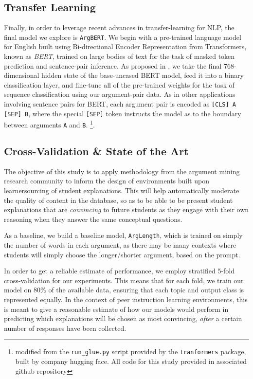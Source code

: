 \documentclass[runningheads]{llncs}
\begin{document}
\subsection{Transfer Learning}
Finally, in order to leverage recent advances in transfer-learning for NLP, the 
final model we explore is \verb|ArgBERT|.
We begin with a pre-trained language model for English built using  
Bi-directional Encoder Representation from Transformers, known as 
\textit{BERT}\cite{devlin_bert_2018}, trained on large bodies of text for the 
task of masked token prediction and sentence-pair inference. 
As proposed in \cite{toledo_automatic_2019}, we take the final 768-dimensional 
hidden state of the base-uncased BERT model, feed it into a binary 
classification layer, and fine-tune all of the pre-trained weights for the task 
of sequence classification using our argument-pair data. 
As in other applications involving sentence pairs for BERT, each argument pair 
is encoded as \verb|[CLS] A [SEP] B|, where the special \verb|[SEP]| token 
instructs the model as to the boundary between arguments \verb|A| and \verb|B|. 
\footnote{modified from the \verb|run_glue.py| 
script provided by the \verb|tranformers| package, built by company hugging 
face. All code for this study provided in associated github repository}.

\subsection{Cross-Validation \& State of the Art}

The objective of this study is to apply methodology from the argument mining 
research community to inform the design of environments built upon 
learnersourcing of student explanations. 
This will help automatically moderate the quality of content in the database, 
so as to be able to be present student explanations that are 
\textit{convincing} to future students as they engage with their own reasoning 
when they answer the same conceptual questions.

As a baseline, we build a baseline model, \verb|ArgLength|, which is trained 
on simply the number of words in each argument, as there may be many contexts 
where students will simply choose the longer/shorter argument, based on the 
prompt. 

In order to get a reliable estimate of performance, we employ stratified 5-fold 
cross-validation for our experiments.
This means that for each fold, we train our model on 80\% of the available 
data, ensuring that each topic and output class is represented equally. 
In the context of peer instruction learning environments, this is meant to give 
a reasonable estimate of how our models would perform in predicting which 
explanations will be chosen as most convincing, \textit{after} a certain number 
of responses have been collected.
 
\end{document}
